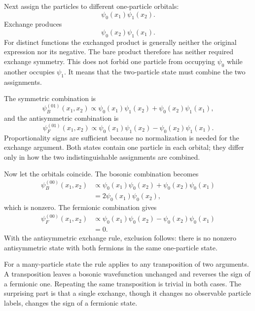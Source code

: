 Next assign the particles to different one-particle orbitals:
\begin{equation}
\psi_0(x_1)\psi_1(x_2).
\end{equation}
Exchange produces
\begin{equation}
\psi_0(x_2)\psi_1(x_1).
\end{equation}
For distinct functions the exchanged product is generally neither the original expression nor its negative. The bare product therefore has neither required exchange symmetry. This does not forbid one particle from occupying \(\psi_0\) while another occupies \(\psi_1\). It means that the two-particle state must combine the two assignments.

The symmetric combination is
\begin{equation}
\psi_B^{(01)}(x_1,x_2)
\propto
\psi_0(x_1)\psi_1(x_2)
+
\psi_0(x_2)\psi_1(x_1),
\end{equation}
and the antisymmetric combination is
\begin{equation}
\psi_F^{(01)}(x_1,x_2)
\propto
\psi_0(x_1)\psi_1(x_2)
-
\psi_0(x_2)\psi_1(x_1).
\end{equation}
Proportionality signs are sufficient because no normalization is needed for the exchange argument. Both states contain one particle in each orbital; they differ only in how the two indistinguishable assignments are combined.

Now let the orbitals coincide. The bosonic combination becomes
\begin{align}
\psi_B^{(00)}(x_1,x_2)
&\propto
\psi_0(x_1)\psi_0(x_2)
+
\psi_0(x_2)\psi_0(x_1)\\
&=
2\psi_0(x_1)\psi_0(x_2),
\end{align}
which is nonzero. The fermionic combination gives
\begin{align}
\psi_F^{(00)}(x_1,x_2)
&\propto
\psi_0(x_1)\psi_0(x_2)
-
\psi_0(x_2)\psi_0(x_1)\\
&=0.
\end{align}
With the antisymmetric exchange rule, exclusion follows: there is no nonzero antisymmetric state with both fermions in the same one-particle state.

For a many-particle state the rule applies to any transposition of two arguments. A transposition leaves a bosonic wavefunction unchanged and reverses the sign of a fermionic one. Repeating the same transposition is trivial in both cases. The surprising part is that a single exchange, though it changes no observable particle labels, changes the sign of a fermionic state.

